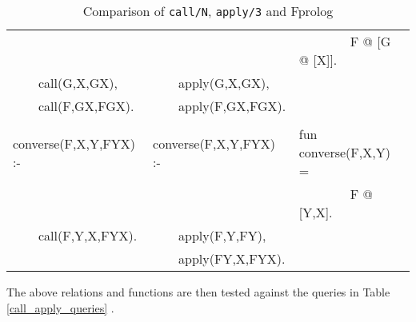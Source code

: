 \documentclass[a4paper,11pt,twoside]{article}
\begin{document}
\begin{table}[htb]
{\begin{tabular}{| l | l | l |}
                           &                           &~~~~~~~~F @ [G @ [X]]. \\
~~~~call(G,X,GX),          &~~~~apply(G,X,GX),         & \\
~~~~call(F,GX,FGX).        &~~~~apply(F,GX,FGX).       & \\
& & \\
converse(F,X,Y,FYX) :-     &converse(F,X,Y,FYX) :-     &fun converse(F,X,Y) =\\
                           &                           &~~~~~~~~F @ [Y,X]. \\
~~~~call(F,Y,X,FYX).       &~~~~apply(F,Y,FY),         &\\
                           &~~~~apply(FY,X,FYX).       &\\
\hline
\end{tabular}
}
\caption{Comparison of \texttt{call/N}, \texttt{apply/3} and Fprolog}
\label{call_apply}
\end{table}

The above relations and functions are then tested against the
queries in Table \ref{call_apply_queries} \cite{Nai96}.
\end{document}

